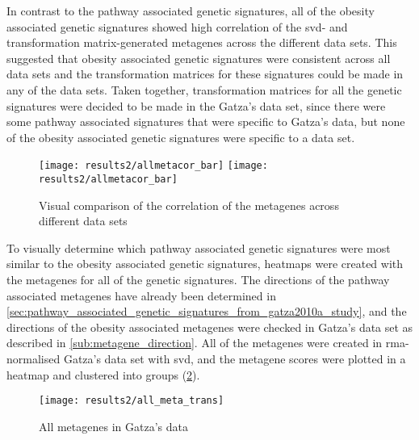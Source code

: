 In contrast to the pathway associated genetic signatures, all of the obesity associated genetic signatures showed high correlation of the \gls{svd}- and transformation matrix-generated metagenes across the different data sets.
This suggested that obesity associated genetic signatures were consistent across all data sets and the transformation matrices for these signatures could be made in any of the data sets.
Taken together, transformation matrices for all the genetic  signatures were decided to be made in the Gatza's data set, since there were some pathway associated signatures that were specific to Gatza's data, but none of the obesity associated genetic signatures were specific to a data set.
\\

\begin{figure}[htpb]
	\centering
	\texttt{[image: results2/allmetacor\_bar]}
	\texttt{[image: results2/allmetacor\_bar]}
	\caption{Visual comparison of the correlation of the metagenes across different data sets}
	\label{fig:allmetacor_bar}
\end{figure}

\noindent
To visually determine which pathway associated genetic signatures were most similar to the obesity associated genetic signatures, heatmaps were created with the metagenes for all of the genetic signatures.
The directions of the pathway associated metagenes have already been determined in \cref{sec:pathway_associated_genetic_signatures_from_gatza2010a_study}, and the directions of the obesity associated metagenes were checked in Gatza's data set as described in \cref{sub:metagene_direction}.
All of the metagenes were created in \gls{rma}-normalised Gatza's data set with \gls{svd}, and the metagene scores were plotted in a heatmap and clustered into groups (\cref{fig:gatza_allmeta}).

\begin{figure}[htpb]
	\centering
	\texttt{[image: results2/all\_meta\_trans]}
	\caption{All metagenes in Gatza's data}
	\label{fig:gatza_allmeta}
\end{figure}

